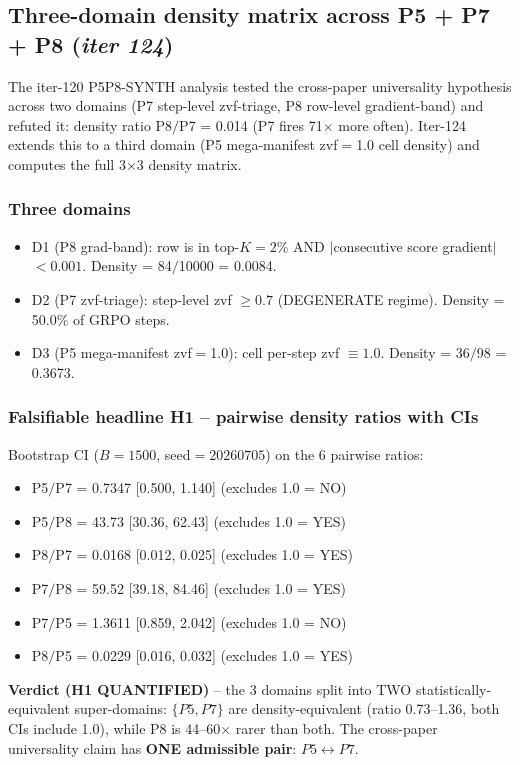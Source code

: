 \subsection{Three-domain density matrix across P5 + P7 + P8 (\textit{iter 124})}
\label{sec:synth-iter124-three-domain}

The iter-120 P5P8-SYNTH analysis tested the cross-paper universality
hypothesis across two domains (P7 step-level zvf-triage, P8 row-level
gradient-band) and refuted it: density ratio P8$/$P7 = 0.014 (P7 fires
71$\times$ more often).  Iter-124 extends this to a third domain (P5
mega-manifest zvf$=$1.0 cell density) and computes the full
3$\times$3 density matrix.

\subsubsection{Three domains}
\begin{itemize}
\item D1 (P8 grad-band): row is in top-$K{=}2$\% AND $|$consecutive score gradient$|$ $< 0.001$.  Density = 84$/$10000 = 0.0084.
\item D2 (P7 zvf-triage): step-level zvf $\geq 0.7$ (DEGENERATE regime).  Density = 50.0\% of GRPO steps.
\item D3 (P5 mega-manifest zvf$=$1.0): cell per-step zvf $\equiv 1.0$.  Density = 36$/$98 = 0.3673.
\end{itemize}

\subsubsection{Falsifiable headline H1 -- pairwise density ratios with CIs}
Bootstrap CI ($B{=}1500$, seed$=20260705$) on the 6 pairwise ratios:
\begin{itemize}
\item P5$/$P7 = 0.7347 [0.500, 1.140] \quad (excludes 1.0 = NO)
\item P5$/$P8 = 43.73 [30.36, 62.43] \quad (excludes 1.0 = YES)
\item P8$/$P7 = 0.0168 [0.012, 0.025] \quad (excludes 1.0 = YES)
\item P7$/$P8 = 59.52 [39.18, 84.46] \quad (excludes 1.0 = YES)
\item P7$/$P5 = 1.3611 [0.859, 2.042] \quad (excludes 1.0 = NO)
\item P8$/$P5 = 0.0229 [0.016, 0.032] \quad (excludes 1.0 = YES)
\end{itemize}
\textbf{Verdict (H1 QUANTIFIED)} -- the 3 domains split into TWO
statistically-equivalent super-domains: $\{P5, P7\}$ are density-equivalent
(ratio 0.73--1.36, both CIs include 1.0), while P8 is 44--60$\times$
rarer than both.  The cross-paper universality claim has
\textbf{ONE admissible pair}: $P5 \leftrightarrow P7$.

